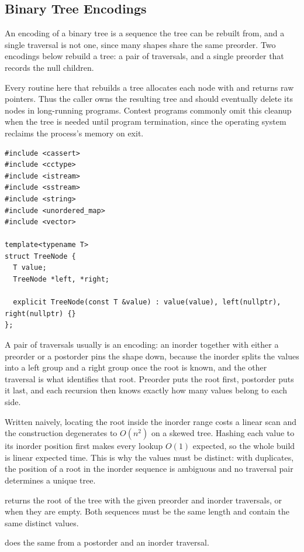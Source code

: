 \subsection{Binary Tree Encodings}
\label{sec:2.2.2}
An encoding of a binary tree is a sequence the tree can be rebuilt from, and a single traversal is not one, since many shapes share the same preorder. Two encodings below rebuild a tree: a pair of traversals, and a single preorder that records the null children.

Every routine here that rebuilds a tree allocates each node with  and returns raw pointers. Thus the caller owns the resulting tree and should eventually delete its nodes in long-running programs. Contest programs commonly omit this cleanup when the tree is needed until program termination, since the operating system reclaims the process's memory on exit.

\begin{lstlisting}[style=cpp]
#include <cassert>
#include <cctype>
#include <istream>
#include <sstream>
#include <string>
#include <unordered_map>
#include <vector>

template<typename T>
struct TreeNode {
  T value;
  TreeNode *left, *right;

  explicit TreeNode(const T &value) : value(value), left(nullptr), right(nullptr) {}
};
\end{lstlisting}
A pair of traversals usually is an encoding: an inorder together with either a preorder or a postorder pins the shape down, because the inorder splits the values into a left group and a right group once the root is known, and the other traversal is what identifies that root. Preorder puts the root first, postorder puts it last, and each recursion then knows exactly how many values belong to each side.

Written naively, locating the root inside the inorder range costs a linear scan and the construction degenerates to $O(n^{2})$ on a skewed tree. Hashing each value to its inorder position first makes every lookup $O(1)$ expected, so the whole build is linear expected time. This is why the values must be distinct: with duplicates, the position of a root in the inorder sequence is ambiguous and no traversal pair determines a unique tree.

\begin{compactitem}
  \item {} returns the root of the tree with the given preorder and inorder traversals, or  when they are empty. Both sequences must be the same length and contain the same distinct values.
  \item {} does the same from a postorder and an inorder traversal.
\end{compactitem}

